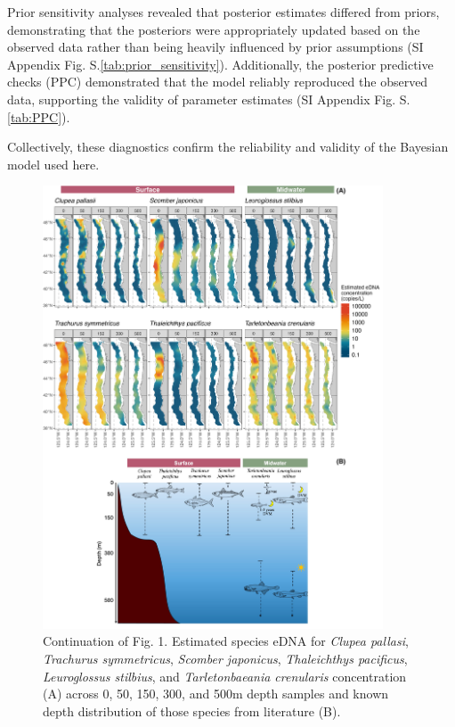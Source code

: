 \documentclass{article}
\begin{document}
Prior sensitivity analyses revealed that posterior estimates differed from priors, demonstrating that the posteriors were appropriately updated based on the observed data rather than being heavily influenced by prior assumptions (SI Appendix Fig. S.\ref{tab:prior_sensitivity}). Additionally, the posterior predictive checks (PPC) demonstrated that the model reliably reproduced the observed data, supporting the validity of parameter estimates (SI Appendix Fig. S.\ref{tab:PPC}). 

Collectively, these diagnostics confirm the reliability and validity of the Bayesian model used here.


\begin{figure}
\centering
\includegraphics[width=0.90\textwidth]{plots/5_Supplementary_Figure_1.jpg}
\caption{Continuation of Fig. 1. Estimated species eDNA for \textit{Clupea pallasi}, \textit{Trachurus symmetricus}, \textit{Scomber japonicus}, \textit{Thaleichthys pacificus}, \textit{Leuroglossus stilbius}, and \textit{Tarletonbaeania crenularis} concentration (A) across 0, 50, 150, 300, and 500m depth samples and known depth distribution of those species from literature (B).}
\end{figure}
\end{document}
